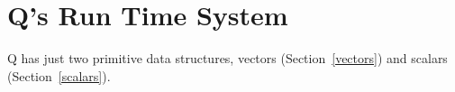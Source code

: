 \section{Q's Run Time System}

Q has just two primitive data structures, vectors (Section~\ref{vectors}) 
and scalars (Section~\ref{scalars}).








